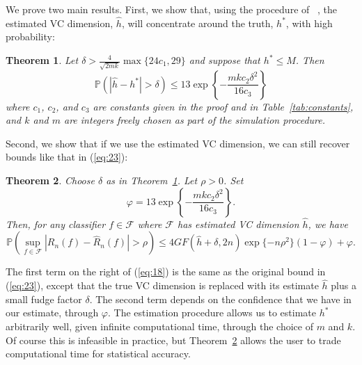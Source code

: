 \documentclass[11pt]{article}
\newtheorem{theorem}{Theorem}[section]
\newcommand{\F}{\mathcal{F}}
\renewcommand{\P}{\mathbb{P}}
\renewcommand{\eqref}[1]{(\ref{eq:#1})}
\renewcommand{\hat}[1]{\widehat{#1}}
\begin{document}
We prove two main results.  First, we show that, using the procedure of
~\citep{VapnikLevin1994}, the estimated VC dimension, $\hat{h}$, will
concentrate around the truth, $h^*$, with high probability:
\begin{theorem}
  \label{thm:main}
  Let $\delta>\frac{4}{\sqrt{2mk}}\max\{24c_1,29\}$ and suppose that $h^* \leq
  M$. Then
  \begin{equation*}
    \label{eq:1a}
    \P\left( |\widehat{h}-h^*| > \delta\right) \leq 13\exp \left\{
      -\frac{mkc_2\delta^2}{16c_3} \right\}
  \end{equation*}
  where $c_1$, $c_2$, and $c_3$ are constants given in the proof and in
  Table~\ref{tab:constants}, and $k$ and $m$ are integers freely chosen as part
  of the simulation procedure.
\end{theorem}

Second, we show that if we use the estimated VC dimension, we can still recover
bounds like that in \eqref{23}:
\begin{theorem}
  \label{thm:bound}
  Choose $\delta$ as in Theorem~\ref{thm:main}. Let $\rho>0$. Set
  $$\varphi=13\exp \left\{-\frac{mkc_2\delta^2} {16c_3}\right\}.$$  Then, for any
  classifier $f \in \F$ where $\F$ has estimated VC dimension $\widehat{h}$, we
  have
  \begin{equation}
    \label{eq:18}
      \P(\sup_{f\in\F}\left|R_n(f) - \widehat{R}_n(f)\right|>\rho)
      \leq 4GF(\hat{h}+\delta,2n) \exp\{-n\rho^2\}(1-\varphi) +\varphi.
  \end{equation}
\end{theorem}
The first term on the right of \eqref{18} is the same as the original bound in
\eqref{23}, except that the true VC dimension is replaced with its estimate
$\hat{h}$ plus a small fudge factor $\delta$. The second term depends on the
confidence that we have in our estimate, through $\varphi$.  The estimation
procedure allows us to estimate $h^*$ arbitrarily well, given infinite
computational time, through the choice of $m$ and $k$.  Of course this is
infeasible in practice, but Theorem~\ref{thm:bound} allows the user to trade
computational time for statistical accuracy.
\end{document}
